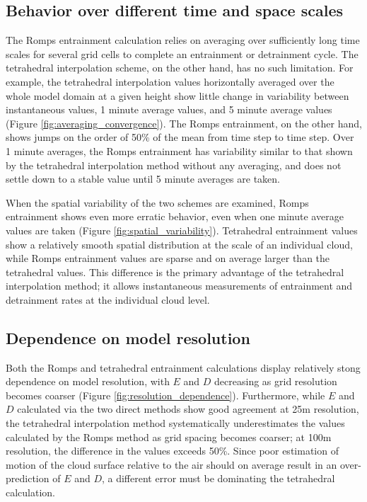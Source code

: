 \documentclass[12pt]{article}
\begin{document}
\subsection{Behavior over different time and space scales}

The Romps entrainment calculation relies on averaging over sufficiently long 
time scales for several grid cells to complete an entrainment or detrainment 
cycle.  The tetrahedral interpolation scheme, on the other hand, has no such 
limitation.  For example, the tetrahedral interpolation values horizontally 
averaged over the whole model domain at a given height show little change in 
variability between instantaneous values, 1 minute average values, and 5 
minute average values (Figure \ref{fig:averaging_convergence}).  The 
Romps entrainment, on the other hand, shows jumps on the order of 50\% of the 
mean from time step to time step.  Over 1 minute averages, the Romps 
entrainment has variability similar to that shown by the tetrahedral 
interpolation method without any averaging, and does not settle down to a 
stable value until 5 minute averages are taken.

When the spatial variability of the two schemes are examined, Romps 
entrainment shows even more erratic behavior, even when one minute average 
values are taken (Figure \ref{fig:spatial_variability}).  Tetrahedral 
entrainment values show a relatively smooth spatial distribution at the scale 
of an individual cloud, while Romps entrainment values are sparse and on 
average larger than the tetrahedral values.  This difference is the primary 
advantage of the tetrahedral interpolation method; it allows instantaneous 
measurements of entrainment and detrainment rates at the individual cloud 
level.

\subsection{Dependence on model resolution}

Both the Romps and tetrahedral entrainment calculations display relatively 
stong dependence on model resolution, with $E$ and $D$ decreasing as grid 
resolution becomes coarser (Figure \ref{fig:resolution_dependence}).  
Furthermore, while $E$ and $D$ calculated via the two direct methods show good 
agreement at 25m resolution, the tetrahedral interpolation method 
systematically underestimates the values calculated by the Romps method as 
grid spacing becomes coarser; at 100m resolution, the difference in the
values exceeds 50\%.  Since poor estimation of motion of the cloud surface 
relative to the air should on average result in an over-prediction of $E$ and
$D$, a different error must be dominating the tetrahedral calculation.
\end{document}
